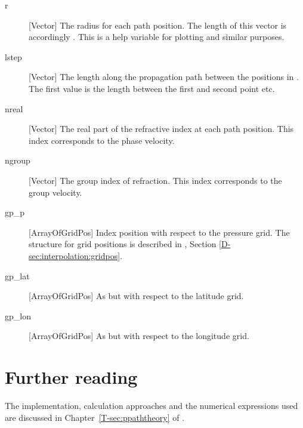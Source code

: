 \begin{description}
   \item[r] [Vector] The radius for each path position. The length of this
     vector is accordingly . This is a help variable for plotting
     and similar purposes. 
     
   \item[lstep] [Vector] The length along the propagation path
     between the positions in . The first value is the
     length between the first and second point etc. 

   \item[nreal] [Vector] The real part of the refractive index at each path
     position. This index corresponds to the phase velocity.

   \item[ngroup] [Vector] The group index of refraction. This index corresponds
     to the group velocity.

   \item[gp\_p] [ArrayOfGridPos] Index position with respect to the
     pressure grid. The structure for grid positions is described in
     \developer, Section \ref{D-sec:interpolation:gridpos}. 
     
   \item[gp\_lat] [ArrayOfGridPos] As  but with
     respect to the latitude grid.

   \item[gp\_lon] [ArrayOfGridPos] As  but with
     respect to the longitude grid.     
\end{description}


\section{Further reading}
The implementation, calculation approaches and the numerical expressions used
are discussed in Chapter~\ref{T-sec:ppaththeory} of \theory.





